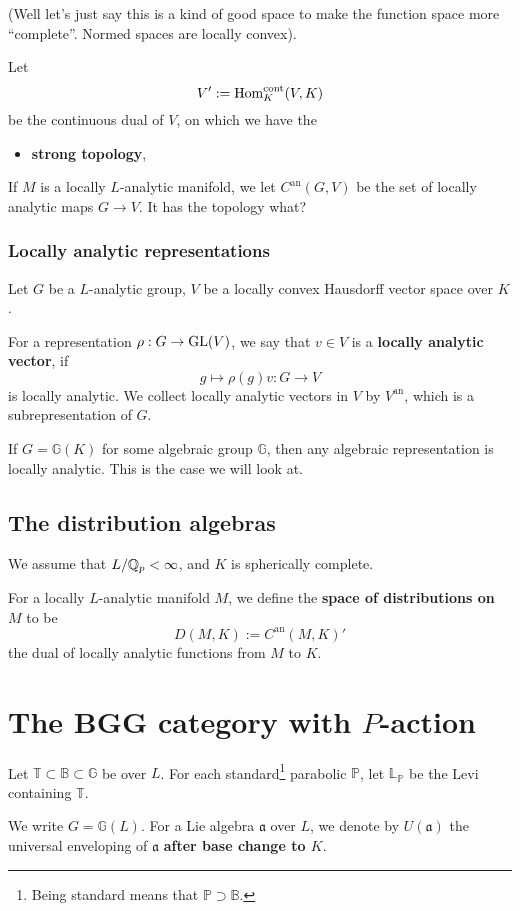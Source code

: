 \documentclass{article}
\newcommand{\an}{\mathrm{an}}
\newcommand{\cont}{\mathrm{cont}}
\begin{document}
(Well let's just say this is a kind of good space to make the function space more ``complete''. Normed spaces are locally convex).

Let \[V' := \Hom_{K}^\cont(V, K)\] be the continuous dual of $V$,
on which we have the \begin{itemize}
    \item \textbf{strong topology}, 
\end{itemize}

If $M$ is a locally $L$-analytic manifold,
we let $C^{\an}(G, V)$ be the set of locally analytic maps $G\to V$.
It has the topology {\color{red} what?}

\subsubsection{Locally analytic representations}
Let $G$ be a $L$-analytic group, $V$ be a locally convex Hausdorff vector space over $K$.

For a representation $\rho : G\to\operatorname{GL}(V)$,
we say that $v\in V$ is a \textbf{locally analytic vector},
if \[g\mapsto\rho(g)v : G\to V\]
is locally analytic.
We collect locally analytic vectors in $V$ by $V^\an$, which is a subrepresentation of $G$.
\begin{example}
    If $G = \mathbb{G}(K)$ for some algebraic group $\mathbb{G}$, then any algebraic representation is locally analytic.
    This is the case we will look at.
\end{example}

\subsection{The distribution algebras}

We assume that $L/\mathbb{Q}_p < \infty$, and $K$ is spherically complete.

For a locally $L$-analytic manifold $M$,
we define the \textbf{space of distributions on $M$} to be\[
D(M, K) := C^\an(M, K)'\]
the dual of locally analytic functions from $M$ to $K$.



\section{The BGG category with \texorpdfstring{$P$}{P}-action}
Let $\mathbb{T\subset B\subset G}$ be over $L$.
For each standard\footnote{
    Being standard means that $\mathbb{P\supset B}$.
} parabolic $\mathbb{P}$,
let $\mathbb{L_P}$ be the Levi containing $\mathbb{T}$.

We write $G = \mathbb{G}(L)$.
For a Lie algebra $\mathfrak{a}$ over $L$,
we denote by $U(\mathfrak{a})$ the universal enveloping of $\mathfrak{a}$ \textbf{after base change to $K$}.
\end{document}
